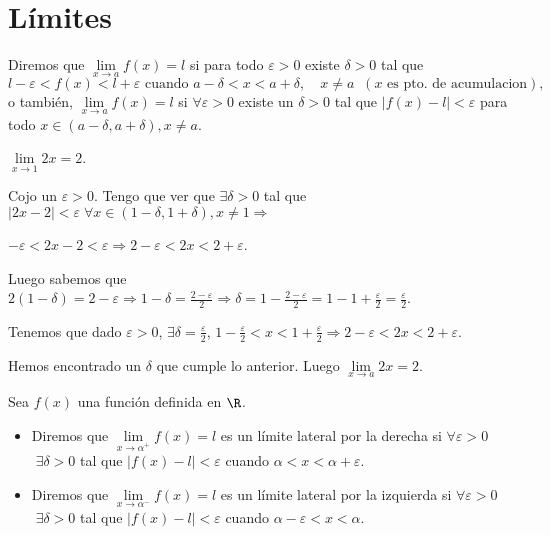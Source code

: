 \section{Límites}
\begin{definition}[Límite]
	Diremos que \(\lim\limits_{x \to a} f(x) = l \) si para todo \(\varepsilon > 0 \) existe \(\delta > 0 \) tal que
	\[
		l - \varepsilon < f(x) < l + \varepsilon \text{ cuando } a - \delta < x < a + \delta, \quad x \neq a \;\;(x \text{ es pto. de acumulacion}  ),
	\]
	o también, \(\lim\limits_{x  \to a } f(x) = l \) si \(\forall \varepsilon > 0 \) existe un \(\delta > 0 \) tal que \(|f(x) - l| < \varepsilon \) para todo \(x \in (a - \delta, a + \delta), x \neq a\).
\end{definition}
\begin{example}
	\(\lim\limits_{x  \to 1 } 2x = 2 \).
	
	Cojo un \(\varepsilon > 0 \). Tengo que ver que \(\exists \delta > 0 \) tal que \(|2x - 2| < \varepsilon \; \forall x \in (1-\delta, 1 + \delta), x \neq 1 \Rightarrow \)
	
	\(- \varepsilon < 2x - 2 < \varepsilon \Rightarrow 2 - \varepsilon < 2x < 2 + \varepsilon\).
	
	Luego sabemos que \(2(1-\delta) = 2 - \varepsilon \Rightarrow 1 - \delta = \frac{2 - \varepsilon}{2 } \Rightarrow \delta = 1 - \frac{2-\varepsilon}{2} = 1 -1 + \frac{\varepsilon}{2} = \frac{\varepsilon}{2}\).
	
	Tenemos que dado \(\varepsilon > 0 \), \(\exists \delta = \frac{\varepsilon}{2}\), \(1 - \frac{\varepsilon}{2} < x < 1 + \frac{\varepsilon}{2} \Rightarrow 2 - \varepsilon < 2x < 2 + \varepsilon\).
	
	Hemos encontrado un \(\delta\) que cumple lo anterior. Luego \(\lim\limits_{x  \to a } 2x = 2 \).
\end{example}
\begin{definition}
	Sea \(f(x )\) una función definida en \(\R \). 
	
	\begin{itemize}
		\item Diremos que \(\lim\limits_{x  \to \alpha^{+} } f(x) = l  \) es un límite lateral por la derecha si \(\forall \varepsilon > 0 \) \(\; \exists \delta > 0 \) tal que \(\left\vert f(x) - l  \right\vert < \varepsilon \) cuando \(\alpha < x < \alpha + \varepsilon\).
		      
		\item Diremos que \(\lim\limits_{x  \to \alpha^{-} } f(x) = l  \) es un límite lateral por la izquierda si \(\forall \varepsilon > 0 \) \(\; \exists \delta > 0 \) tal que \(\left\vert f(x) - l  \right\vert < \varepsilon \) cuando \(\alpha- \varepsilon < x < \alpha\).
	\end{itemize}
	
\end{definition}
